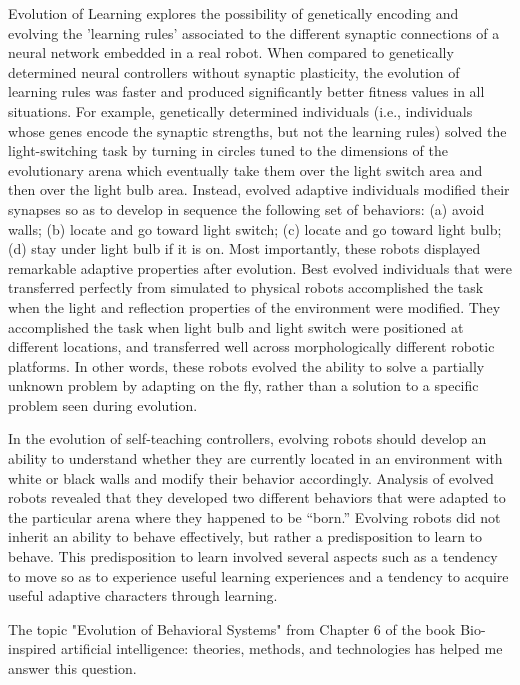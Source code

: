 \documentclass[a4paper, 10pt]{article}
\begin{document}
Evolution of Learning explores the possibility of genetically encoding and evolving the 'learning rules' associated to the different synaptic connections of a neural network embedded in a real robot. When compared to genetically determined neural controllers without
synaptic plasticity, the evolution of learning rules was faster and produced significantly better fitness values in all situations. For example, genetically determined individuals (i.e., individuals whose genes encode the synaptic strengths, but not the learning rules) solved the light-switching task by turning in circles tuned to the dimensions of the evolutionary arena which eventually take them over the light switch area and then over the light bulb area. Instead, evolved adaptive individuals modiﬁed their synapses so as to develop in sequence the following set of behaviors: (a) avoid walls; (b) locate and go toward light switch; (c) locate and go toward light bulb; (d) stay under light bulb if it is on. Most importantly, these robots displayed remarkable adaptive properties after evolution. Best evolved individuals that were transferred perfectly from simulated to physical robots accomplished the task when the light and reﬂection properties of the environment were modiﬁed. They accomplished the task when light bulb and light switch were positioned at different locations, and transferred well across morphologically different robotic platforms. In other words, these robots evolved the ability to solve a partially unknown problem by adapting on the ﬂy, rather than a solution to a speciﬁc problem seen during evolution.



In the evolution of self-teaching controllers, evolving robots should develop an ability to understand whether they are currently located in an environment with white or black walls and modify their behavior accordingly.
Analysis of evolved robots revealed that they developed two different behaviors that were adapted to the particular arena where they happened to be “born.” Evolving robots did not inherit an ability to behave effectively, but rather a predisposition to learn to behave. This predisposition to learn involved several aspects such as a tendency to move so as to experience useful learning experiences and a tendency to acquire useful adaptive characters through learning.

The topic "Evolution of Behavioral Systems" from Chapter 6 of the book Bio-inspired artificial intelligence: theories, methods, and technologies \cite{floreano} has helped me answer this question.
\end{document}
